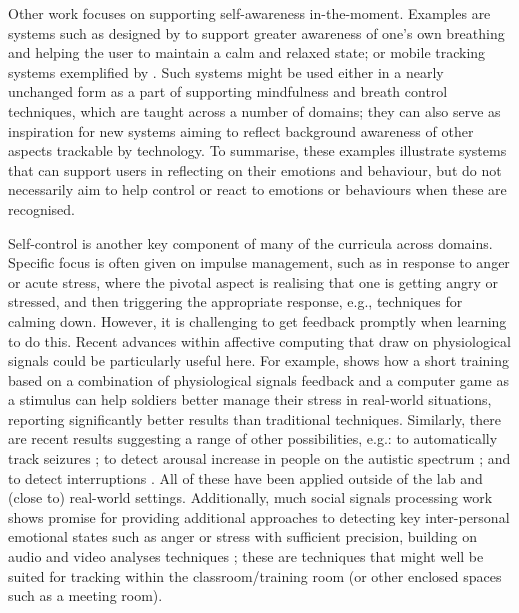 \documentclass[prodmode,acmtochi]{acmsmall}
\newcommand{\todo}[1]{\textrm{\textrm{\textcolor{LightBlue}{[[#1]]}}}}
\newcommand{\GeraldineTODO}[1]{}
\begin{document}
Other work focuses on supporting self-awareness in-the-moment. Examples are  systems such as designed by  to support greater awareness of one's own breathing and helping the user to maintain a calm and relaxed state; or mobile tracking systems exemplified by . Such systems might be used either in a nearly unchanged form as a part of supporting mindfulness and breath control techniques, which are taught across a number of domains; they can also serve as inspiration for new systems aiming to reflect background awareness of other aspects \GeraldineTODO{G: such as?}trackable by technology. 
%
To summarise, these examples illustrate systems that can support users in reflecting on their emotions and behaviour, but do not necessarily aim to help control or react to emotions or behaviours when these are recognised.


Self-control is another key component of many of the curricula across domains. Specific focus is often given on impulse management, such as in response to anger or acute stress, where the pivotal aspect is realising that one is getting angry or stressed, %
        and then triggering the appropriate response, e.g., techniques for calming down. However, it is challenging to get feedback promptly when learning to do this. 
%       
        Recent advances within affective computing that draw on physiological signals could be particularly useful here. 
%       
        For example,  shows how a short training based on a combination of physiological signals feedback and a computer game as a stimulus can help soldiers better manage their stress in real-world situations, reporting significantly better results than traditional techniques. Similarly, there are recent results suggesting a range of other possibilities, e.g.: to automatically track seizures \cite{Poh2012}; to detect arousal increase in people on the autistic spectrum \cite{Picard2009}; and to detect interruptions \cite{Pan2011}. All of these have been applied outside of the lab and (close to) real-world settings. Additionally, much social signals processing work shows promise for providing additional approaches to detecting key inter-personal emotional states such as anger or stress with sufficient precision, building on audio and video analyses techniques \cite{Vinciarelli2012}; these are techniques that might well be suited for tracking  within the classroom/training room (or other enclosed spaces such as a meeting room). 
%
\end{document}
